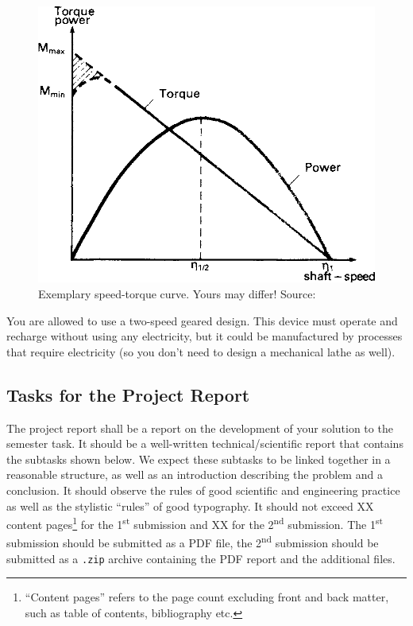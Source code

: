 \documentclass[headinclude=true]{scrartcl}
\begin{document}
\begin{figure} \centering
 \includegraphics[width=0.5\linewidth]{speed-torque}
 \caption{Exemplary speed-torque curve. Yours may differ! Source: \cite{Barber1997}}
\end{figure}


You are allowed to use a two-speed geared design. This device must operate and recharge without using any electricity, but it could be manufactured by processes that require electricity (so you don't need to design a mechanical lathe as well).

\subsection{Tasks for the Project Report}

The project report shall be a report on the development of your solution to the semester task. It should be a well-written technical/scientific report that contains the subtasks shown below. We expect these subtasks to be linked together in a reasonable structure, as well as an introduction describing the problem and a conclusion. It should observe the rules of good scientific and engineering practice as well as the stylistic ``rules'' of good typography. It should not exceed XX content pages\footnote{``Content pages'' refers to the page count excluding front and back matter, such as table of contents, bibliography etc.} for the 1\textsuperscript{st} submission and XX for the 2\textsuperscript{nd} submission. The 1\textsuperscript{st} submission should be submitted as a PDF file, the 2\textsuperscript{nd} submission should be submitted as a \texttt{.zip} archive containing the PDF report and the additional files.
\end{document}
